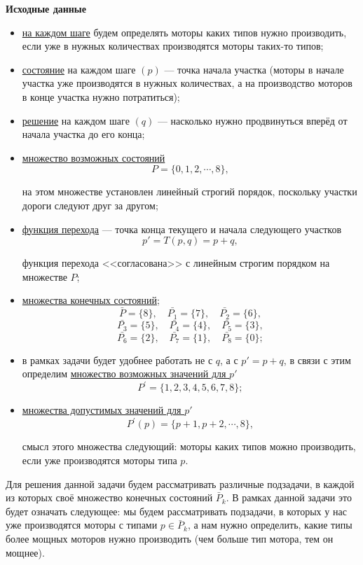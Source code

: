 \textbf{Исходные данные}
\begin{itemize}[nosep]	
	\item \underline{на каждом шаге} будем определять моторы каких типов нужно производить, если уже в нужных количествах производятся моторы таких-то типов;
	
	\item \underline{состояние} на каждом шаге $(p)$ --- точка начала участка (моторы в начале участка уже производятся в нужных количествах, а на производство моторов в конце участка нужно потратиться);
	
	\item \underline{решение} на каждом шаге $(q)$ --- насколько нужно продвинуться вперёд от начала участка до его конца;
	
	\item \underline{множество возможных состояний}
	\[P= \big\{0, 1, 2, \cdots, 8 \big\},\]
	
	на этом множестве установлен линейный строгий порядок, поскольку участки дороги следуют друг за другом;
	
	\item \underline{функция перехода} --- точка конца текущего и начала следующего участков
	\[p' = T(p, q) = p + q,\]
	
	функция перехода <<согласована>> с линейным строгим порядком на множестве $P$;
	
	\item \underline{множества конечных состояний};
	\[
	\bar{P} = \{8\}, \quad \bar{P_1} = \{7\}, \quad \bar{P_2} = \{6\},
	\]
	\[
	\bar{P_3} = \{5\}, \quad \bar{P_4} = \{4\}, \quad \bar{P_5} = \{3\},
	\]
	\[
	\bar{P_6} = \{2\}, \quad \bar{P_7} = \{1\}, \quad \bar{P_8} = \{0\};
	\]
	
	\item в рамках задачи будет удобнее работать не с $q$, а с $p'= p + q$, в связи с этим определим \underline{множество возможных значений для $p'$}
	\[P^{'} = \{1, 2, 3, 4, 5, 6, 7, 8\};\]
	
	\item \underline{множества допустимых значений для $p'$}
	\[P^{'}(p) = \{p+1, p+2, \cdots, 8\},\]
	
	смысл этого множества следующий: моторы каких типов можно производить, если уже производятся моторы типа $p$.
\end{itemize}

Для решения данной задачи будем рассматривать различные подзадачи, в каждой из которых своё множество конечных состояний $\bar{P}_k$. В рамках данной задачи это будет означать следующее: мы будем рассматривать подзадачи, в которых у нас уже производятся моторы с типами $p \in \bar{P}_k$, а нам нужно определить, какие типы более мощных моторов нужно производить (чем больше тип мотора, тем он мощнее).

